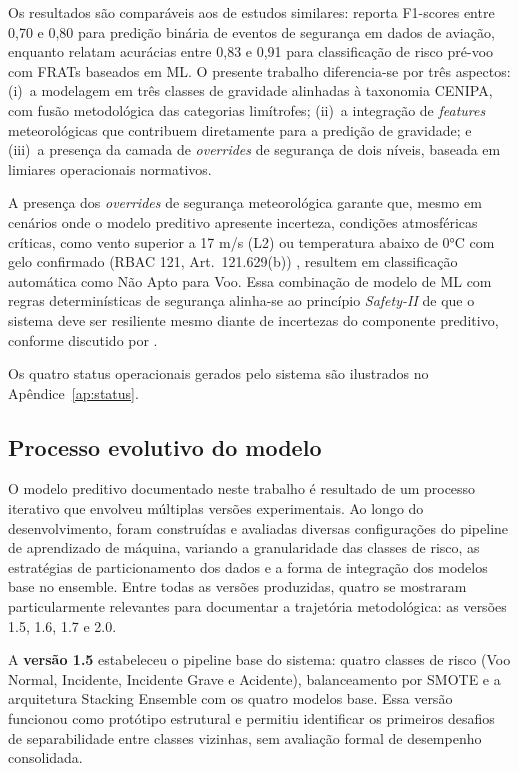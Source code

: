 \documentclass[english,brazilian]{UNISINOSartigo}
\begin{document}
Os resultados são comparáveis aos de estudos similares:  reporta
F1-scores entre 0,70 e 0,80 para predição binária de eventos de segurança em dados de
aviação, enquanto  relatam acurácias entre 0,83 e 0,91 para
classificação de risco pré-voo com FRATs baseados em ML. O presente trabalho
diferencia-se por três aspectos: (i)~a modelagem em três classes de gravidade
alinhadas à taxonomia CENIPA, com fusão metodológica das categorias limítrofes;
(ii)~a integração de \textit{features} meteorológicas que contribuem diretamente
para a predição de gravidade; e (iii)~a presença da camada de \textit{overrides}
de segurança de dois níveis, baseada em limiares operacionais normativos.

A presença dos \textit{overrides} de segurança meteorológica garante que, mesmo
em cenários onde o modelo preditivo apresente incerteza, condições atmosféricas
críticas, como vento superior a 17 m/s (L2) ou temperatura abaixo de 0°C com gelo
confirmado (RBAC 121, Art.~121.629(b)) \cite{RBAC121}, resultem em classificação
automática como Não Apto para Voo. Essa combinação de modelo de ML com regras determinísticas
de segurança alinha-se ao princípio \textit{Safety-II} de que o sistema deve ser
resiliente mesmo diante de incertezas do componente preditivo, conforme discutido por
.

Os quatro status operacionais gerados pelo sistema são ilustrados no Apêndice~\ref{ap:status}.

\subsection{Processo evolutivo do modelo}

O modelo preditivo documentado neste trabalho é resultado de um processo iterativo
que envolveu múltiplas versões experimentais. Ao longo do desenvolvimento, foram
construídas e avaliadas diversas configurações do pipeline de aprendizado de máquina,
variando a granularidade das classes de risco, as estratégias de particionamento dos
dados e a forma de integração dos modelos base no ensemble. Entre todas as versões
produzidas, quatro se mostraram particularmente relevantes para documentar a trajetória
metodológica: as versões 1.5, 1.6, 1.7 e 2.0.

A \textbf{versão 1.5} estabeleceu o pipeline base do sistema: quatro classes de risco
(Voo Normal, Incidente, Incidente Grave e Acidente), balanceamento por SMOTE e a
arquitetura Stacking Ensemble com os quatro modelos base. Essa versão funcionou como
protótipo estrutural e permitiu identificar os primeiros desafios de separabilidade
entre classes vizinhas, sem avaliação formal de desempenho consolidada.
\end{document}
